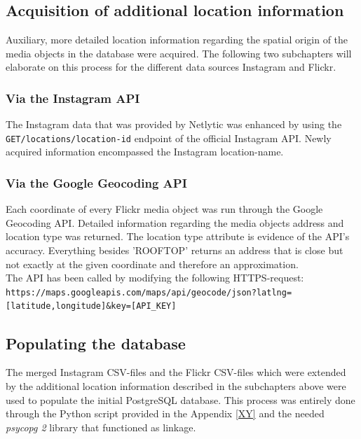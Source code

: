 \subsection{Acquisition of additional location information} \label{add_location_data}
Auxiliary, more detailed location information regarding the spatial origin of the media objects in the database were acquired. The following two subchapters will elaborate on this process for the different data sources Instagram and Flickr.

\subsubsection{Via the Instagram API}
The Instagram data that was provided by Netlytic was enhanced by using the \texttt{GET/locations/location-id} endpoint of the official Instagram API. Newly acquired information encompassed the Instagram location-name.

\subsubsection{Via the Google Geocoding API}
Each coordinate of every Flickr media object was run through the Google Geocoding API. Detailed information regarding the media objects address and location type was returned. The location type attribute is evidence of the API\rq s accuracy. Everything besides 'ROOFTOP' returns an address that is close but not exactly at the given coordinate and therefore an approximation.\\
The API has been called by modifying the following HTTPS-request:\\
\texttt{https://maps.googleapis.com/maps/api/geocode/json?latlng=[latitude,longitude]&key=[API\_KEY]}

\subsection{Populating the database} \label{populate_db}
The merged Instagram CSV-files and the Flickr CSV-files which were extended by the additional location information described in the subchapters above were used to populate the initial PostgreSQL database. This process was entirely done through the Python script provided in the Appendix \ref{XY} and the needed \textit{psycopg 2} library that functioned as linkage.

